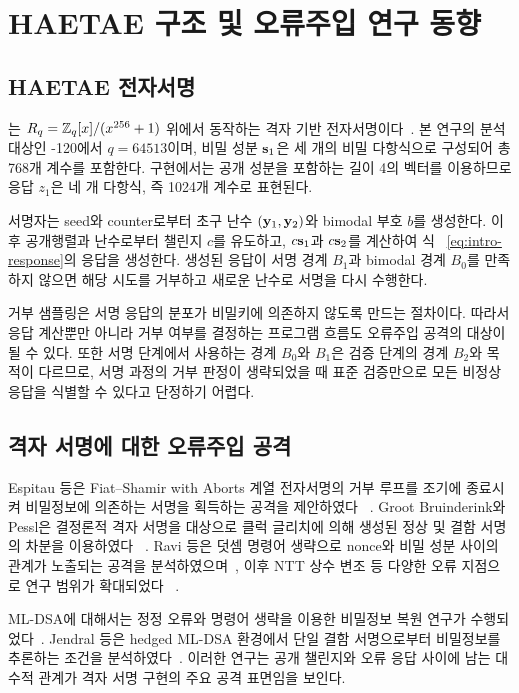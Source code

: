 \section{HAETAE 구조 및 오류주입 연구 동향}
\label{sec:background}

\subsection{HAETAE 전자서명}

는 $R_q=\mathbb{Z}_q[x]/(x^{256}+1)$ 위에서 동작하는
격자 기반 전자서명이다~\cite{haetae}. 본 연구의 분석 대상인
-120에서 $q=64513$이며, 비밀 성분 $\mathbf{s}_1$은 세 개의
비밀 다항식으로 구성되어 총 768개 계수를 포함한다. 구현에서는 공개
성분을 포함하는 길이 4의 벡터를 이용하므로 응답 $z_1$은 네 개 다항식,
즉 1024개 계수로 표현된다.

서명자는 seed와 counter로부터 초구 난수 $(\mathbf{y}_1,\mathbf{y}_2)$와
bimodal 부호 $b$를 생성한다. 이후 공개행렬과 난수로부터 챌린지 $c$를
유도하고, $c\mathbf{s}_1$과 $c\mathbf{s}_2$를 계산하여 식
~\eqref{eq:intro-response}의 응답을 생성한다. 생성된 응답이 서명 경계
$B_1$과 bimodal 경계 $B_0$를 만족하지 않으면 해당 시도를 거부하고
새로운 난수로 서명을 다시 수행한다.

거부 샘플링은 서명 응답의 분포가 비밀키에 의존하지 않도록 만드는
절차이다. 따라서 응답 계산뿐만 아니라 거부 여부를 결정하는 프로그램
흐름도 오류주입 공격의 대상이 될 수 있다. 또한 서명 단계에서 사용하는
경계 $B_0$와 $B_1$은 검증 단계의 경계 $B_2$와 목적이 다르므로,
서명 과정의 거부 판정이 생략되었을 때 표준 검증만으로 모든 비정상 응답을
식별할 수 있다고 단정하기 어렵다.

\subsection{격자 서명에 대한 오류주입 공격}

Espitau 등은 Fiat--Shamir with Aborts 계열 전자서명의 거부 루프를
조기에 종료시켜 비밀정보에 의존하는 서명을 획득하는 공격을 제안하였다
~\cite{espitau2016}. Groot Bruinderink와 Pessl은 결정론적 격자 서명을
대상으로 클럭 글리치에 의해 생성된 정상 및 결함 서명의 차분을 이용하였다
~\cite{bruinderink2018}. Ravi 등은 덧셈 명령어 생략으로 nonce와 비밀
성분 사이의 관계가 노출되는 공격을 분석하였으며~\cite{ravi2019determinism},
이후 NTT 상수 변조 등 다양한 오류 지점으로 연구 범위가 확대되었다
~\cite{ravi2023ntt}.

ML-DSA에 대해서는 정정 오류와 명령어 생략을 이용한 비밀정보 복원
연구가 수행되었다~\cite{krahmer2024,elghamrawy2023}. Jendral 등은
hedged ML-DSA 환경에서 단일 결함 서명으로부터 비밀정보를 추론하는
조건을 분석하였다~\cite{jendral2024}. 이러한 연구는 공개 챌린지와
오류 응답 사이에 남는 대수적 관계가 격자 서명 구현의 주요 공격 표면임을
보인다.

